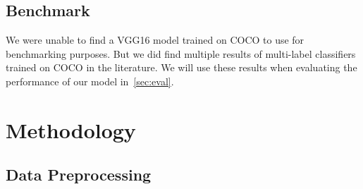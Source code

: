 \documentclass[12pt,journal,compsoc]{IEEEtran}
\begin{document}
\subsection{Benchmark}


We were unable to find a VGG16 model trained on COCO to use for benchmarking purposes.  But we did find multiple results of multi-label classifiers trained on COCO in the literature.  We will use these results when evaluating the performance of our model in~\ref{sec:eval}.

\section{Methodology}\label{sec:method} %
\subsection{Data Preprocessing}\label{sec:preproc}

\end{document}
